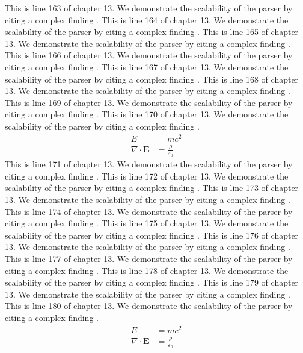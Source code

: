 This is line 163 of chapter 13. We demonstrate the scalability of the parser by citing a complex finding \cite{ref13_163}.
This is line 164 of chapter 13. We demonstrate the scalability of the parser by citing a complex finding \cite{ref13_164}.
This is line 165 of chapter 13. We demonstrate the scalability of the parser by citing a complex finding \cite{ref13_165}.
This is line 166 of chapter 13. We demonstrate the scalability of the parser by citing a complex finding \cite{ref13_166}.
This is line 167 of chapter 13. We demonstrate the scalability of the parser by citing a complex finding \cite{ref13_167}.
This is line 168 of chapter 13. We demonstrate the scalability of the parser by citing a complex finding \cite{ref13_168}.
This is line 169 of chapter 13. We demonstrate the scalability of the parser by citing a complex finding \cite{ref13_169}.
This is line 170 of chapter 13. We demonstrate the scalability of the parser by citing a complex finding \cite{ref13_170}.
\begin{align*}
  E &= mc^2 \\
  \nabla \cdot \mathbf{E} &= \frac{\rho}{\varepsilon_0}
\end{align*}
This is line 171 of chapter 13. We demonstrate the scalability of the parser by citing a complex finding \cite{ref13_171}.
This is line 172 of chapter 13. We demonstrate the scalability of the parser by citing a complex finding \cite{ref13_172}.
This is line 173 of chapter 13. We demonstrate the scalability of the parser by citing a complex finding \cite{ref13_173}.
This is line 174 of chapter 13. We demonstrate the scalability of the parser by citing a complex finding \cite{ref13_174}.
This is line 175 of chapter 13. We demonstrate the scalability of the parser by citing a complex finding \cite{ref13_175}.
This is line 176 of chapter 13. We demonstrate the scalability of the parser by citing a complex finding \cite{ref13_176}.
This is line 177 of chapter 13. We demonstrate the scalability of the parser by citing a complex finding \cite{ref13_177}.
This is line 178 of chapter 13. We demonstrate the scalability of the parser by citing a complex finding \cite{ref13_178}.
This is line 179 of chapter 13. We demonstrate the scalability of the parser by citing a complex finding \cite{ref13_179}.
This is line 180 of chapter 13. We demonstrate the scalability of the parser by citing a complex finding \cite{ref13_180}.
\begin{align*}
  E &= mc^2 \\
  \nabla \cdot \mathbf{E} &= \frac{\rho}{\varepsilon_0}
\end{align*}
